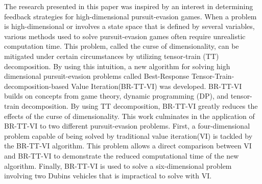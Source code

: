 % 
% 
%
The research presented in this paper was inspired by an interest in determining feedback strategies for high-dimensional pursuit-evasion games. When a problem is high-dimensional or involves a state space that is defined by several variables, various methods used to solve pursuit-evasion games often require unrealistic computation time. This problem, called the curse of dimensionality, can be mitigated under certain circumstances by utilizing tensor-train (TT) decomposition. By using this intuition, a new algorithm for solving high dimensional pursuit-evasion problems called Best-Response Tensor-Train-decomposition-based Value Iteration(BR-TT-VI) was developed. BR-TT-VI builds on concepts from game theory, dynamic programming (DP), and tensor-train decomposition. By using TT decomposition, BR-TT-VI greatly reduces the effects of the curse of dimensionality. This work culminates in the application of BR-TT-VI to two different pursuit-evasion problems. First, a four-dimensional problem capable of being solved by traditional value iteration(VI) is tackled by the BR-TT-VI algorithm. This problem allows a direct comparison between VI and BR-TT-VI to demonstrate the reduced computational time of the new algorithm. Finally, BR-TT-VI is used to solve a six-dimensional problem involving two Dubins vehicles that is impractical to solve with VI.   
